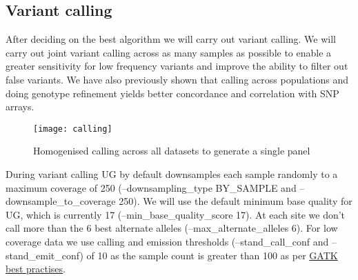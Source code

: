 \subsection{Variant calling}
After deciding on the best algorithm we will carry out variant calling. We will carry out joint variant calling across as many samples as possible to enable a greater sensitivity for low frequency variants and improve the ability to filter out false variants. We have also previously shown that calling across populations and doing genotype refinement yields better concordance and correlation with SNP arrays.

\begin{figure}[!htbp]
\centering
\texttt{[image: calling]}
\caption{Homogenised calling across all datasets to generate a single panel}
\label{fig:calling}
\end{figure}
During variant calling UG by default downsamples each sample randomly to a maximum coverage of 250 (--downsampling\_type BY\_SAMPLE and --downsample\_to\_coverage 250). We will use the default minimum base quality for UG, which is currently 17 (--min\_base\_quality\_score 17). %
At each site we don't call more than the 6 best alternate alleles (--max\_alternate\_alleles 6).
For low coverage data we use calling and emission thresholds (--stand\_call\_conf and --stand\_emit\_conf) of 10 as the sample count is greater than 100 as per \href{https://www.broadinstitute.org/gatk/guide/pdfdocs/GATK_GuideBook_2.7-4.pdf}{GATK best practises}. %


